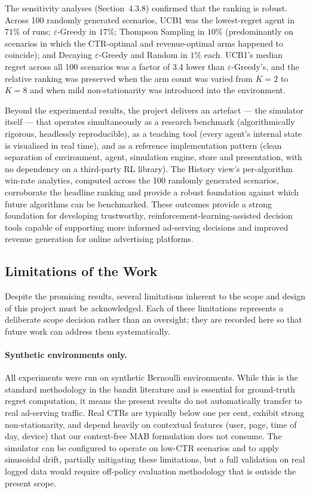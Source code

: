 The sensitivity analyses (Section~4.3.8) confirmed that the ranking is robust. Across 100 randomly generated scenarios, UCB1 was the lowest-regret agent in $71\%$ of runs; $\varepsilon$-Greedy in $17\%$; Thompson Sampling in $10\%$ (predominantly on scenarios in which the CTR-optimal and revenue-optimal arms happened to coincide); and Decaying $\varepsilon$-Greedy and Random in $1\%$ each. UCB1's median regret across all 100 scenarios was a factor of 3.4 lower than $\varepsilon$-Greedy's, and the relative ranking was preserved when the arm count was varied from $K=2$ to $K=8$ and when mild non-stationarity was introduced into the environment.

Beyond the experimental results, the project delivers an artefact --- the simulator itself --- that operates simultaneously as a research benchmark (algorithmically rigorous, headlessly reproducible), as a teaching tool (every agent's internal state is visualised in real time), and as a reference implementation pattern (clean separation of environment, agent, simulation engine, store and presentation, with no dependency on a third-party RL library). The History view's per-algorithm win-rate analytics, computed across the 100 randomly generated scenarios, corroborate the headline ranking and provide a robust foundation against which future algorithms can be benchmarked. These outcomes provide a strong foundation for developing trustworthy, reinforcement-learning-assisted decision tools capable of supporting more informed ad-serving decisions and improved revenue generation for online advertising platforms.

\subsection{Limitations of the Work}
Despite the promising results, several limitations inherent to the scope and design of this project must be acknowledged. Each of these limitations represents a deliberate scope decision rather than an oversight; they are recorded here so that future work can address them systematically.

\paragraph{Synthetic environments only.} All experiments were run on synthetic Bernoulli environments. While this is the standard methodology in the bandit literature and is essential for ground-truth regret computation, it means the present results do not automatically transfer to real ad-serving traffic. Real CTRs are typically below one per cent, exhibit strong non-stationarity, and depend heavily on contextual features (user, page, time of day, device) that our context-free MAB formulation does not consume. The simulator can be configured to operate on low-CTR scenarios and to apply sinusoidal drift, partially mitigating these limitations, but a full validation on real logged data would require off-policy evaluation methodology that is outside the present scope.

